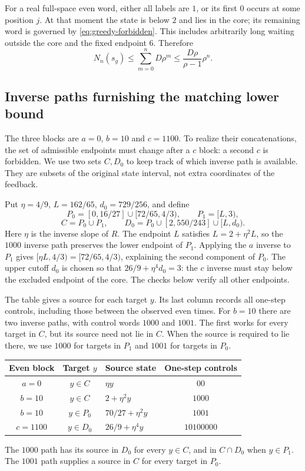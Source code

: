\documentclass[11pt,reqno]{amsart}
\numberwithin{equation}{section}
\theoremstyle{definition}
\theoremstyle{definition}
\begin{document}
For a real full-space even word, either all labels are $1$, or its
first $0$ occurs at some position $j$. At that moment the state
is below $2$ and lies in the core; its remaining word is governed
by \eqref{eq:greedy-forbidden}. This includes arbitrarily long
waiting outside the core and the fixed endpoint $6$.
Therefore
\begin{equation}\label{eq:greedy-upper}
 N_n(s_g)\le\sum_{m=0}^n D\rho^m
 \le\frac{D\rho}{\rho-1}\rho^n.
\end{equation}
\subsection*{Inverse paths furnishing the matching lower bound}
The three blocks are $a=0$, $b=10$ and $c=1100$. To realize their
concatenations, the set of admissible endpoints must change after a
$c$ block: a second $c$ is forbidden. We use two sets $C,D_0$ to
keep track of which inverse path is available. They are subsets of
the original state interval, not extra coordinates of the feedback.

Put $\eta=4/9$, $L=162/65$, $d_0=729/256$, and define
\[
 P_0=[0,16/27]\cup[72/65,4/3),\qquad P_1=[L,3),
\]
\[
 C=P_0\cup P_1,\qquad
 D_0=P_0\cup[2,550/243]\cup[L,d_0).
\]
Here $\eta$ is the inverse slope of $R$. The endpoint $L$ satisfies
$L=2+\eta^2L$, so the $1000$ inverse path preserves the lower
endpoint of $P_1$. Applying the $a$ inverse to $P_1$ gives
$[\eta L,4/3)=[72/65,4/3)$, explaining the second component
of $P_0$. The upper cutoff $d_0$ is chosen so that
$26/9+\eta^4d_0=3$: the $c$ inverse must stay below the excluded
endpoint of the core. The checks below verify all other endpoints.

The table gives a source for each target $y$. Its last column records
all one-step controls, including those between the observed even times.
For $b=10$ there are two inverse paths, with control words $1000$
and $1001$. The first works for every target in $C$, but its source
need not lie in $C$. When the source is required to lie there, we use
$1000$ for targets in $P_1$ and $1001$ for targets in $P_0$.
\begin{center}
\begin{tabular}{cclc}
\toprule
Even block&Target $y$&Source state&One-step controls\\
\midrule
$a=0$&$y\in C$&$\eta y$&$00$\\
$b=10$&$y\in C$&$2+\eta^2y$&$1000$\\
$b=10$&$y\in P_0$&$70/27+\eta^2y$&$1001$\\
$c=1100$&$y\in D_0$&$26/9+\eta^4y$&$10100000$\\
\bottomrule
\end{tabular}
\end{center}
The $1000$ path has its source in $D_0$ for every $y\in C$,
and in $C\cap D_0$ when $y\in P_1$. The $1001$ path supplies
a source in $C$ for every target in $P_0$.
\end{document}
